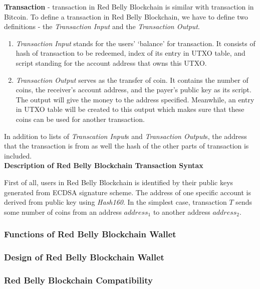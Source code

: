 \documentclass[12pt]{article}
\begin{document}
\textbf{Transaction} - transaction in Red Belly Blockchain is similar with transaction in Bitcoin. To define a transaction in Red Belly Blockchain, we have to define two definitions - the \textit{Transaction Input} and the \textit{Transaction Output}.

\begin{enumerate}
       \item \textit{Transaction Input} stands for the users' `balance' for transaction. It consists of hash of transaction to be redeemed, index of its entry in UTXO table, and script standing for the account address that owns this UTXO.
       \item \textit{Transaction Output} serves as the transfer of coin. It contains the number of coins, the receiver's account address, and the payer's public key as its script. The output will give the money to the address specified. Meanwhile, an entry in UTXO table will be created to this output which makes sure that these coins can be used for another transaction.
\end{enumerate}

In addition to lists of \textit{Transcation Input}s and \textit{Transaction Output}s, the address that the transaction is from as well the hash of the other parts of transaction is included.\\

\textbf{Description of Red Belly Blockchain Transaction Syntax}

First of all, users in Red Belly Blockchain is identified by their public keys generated from ECDSA signature scheme. The address of one specific account is derived from public key using \textit{Hash160}. In the simplest case, transaction $T$ sends some number of coins from an address ${address_1}$ to another address ${address_2}$. 

\subsubsection{Functions of Red Belly Blockchain Wallet}

\subsubsection{Design of Red Belly Blockchain Wallet}

\subsubsection{Red Belly Blockchain Compatibility}
\end{document}

